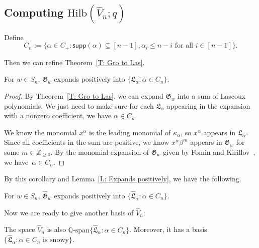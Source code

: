 \documentclass[ALCO]{cedram}
\newcommand{\fG}{\mathfrak{G}}
\newcommand{\fGb}{\fG}
\newcommand{\fL}{\mathfrak{L}}
\newcommand{\fLb}{\fL}
\newcommand{\topLas}{\widehat{\fL}}
\newcommand{\topGro}{\widehat{\fG}}
\newcommand{\supp}{\mathsf{supp}}
\newcommand{\Q}{\mathbb{Q}}
\newcommand{\Hilb}{\mathrm{Hilb}}
\begin{document}
\subsection{Computing \texorpdfstring{$\Hilb(\widehat{V}_n; q)$}{TEXT}}
\label{subsec.hilbert.vn}

Define 
$$C_n := \{ \alpha \in C_+: \supp(\alpha) \subseteq [n - 1], \alpha_i \leq n - i \textrm{ for all $i \in [n - 1]$}\}.$$

Then we can refine 
Theorem~\ref{T: Gro to Las}.
\begin{cor}
\label{C: Gro to Las for n}
For $w \in S_n$, 
$\fGb_w$ expands positively into $\{\fLb_\alpha: \alpha \in C_n\}$.
\end{cor}
\begin{proof}
By Theorem~\ref{T: Gro to Las},
we can expand $\fGb_w$ into a sum of Lascoux polynomials.
We just need to make sure for each $\fLb_{\alpha}$ appearing
in the expansion with a nonzero coefficient,
we have $\alpha \in C_n$.

We know the monomial $x^\alpha$ is the leading monomial of 
$\kappa_\alpha$, so $x^\alpha$ appears in $\fLb_\alpha$.
Since all coefficients in the sum are positive,
we know $x^\alpha \beta^m$ appears in $\fGb_w$ for
some $m \in \mathbb{Z}_{\geq 0}$.
By the monomial expansion of $\fGb_w$ 
given by Fomin and Kirillov~\cite{FK},
we have~$\alpha \in C_n$.
\end{proof}

By this corollary and Lemma~\ref{L: Expands positively},
we have the following. 
\begin{cor}
\label{C: Top Gro to Top Las for n}
For $w \in S_n$, 
$\topGro_w$ expands positively 
into $\{\topLas_\alpha: \alpha \in C_n\}$.
\end{cor}

Now we are ready to give another basis of $\widehat{V}_n$:
\begin{prop}
\label{P: Top Las basis}
The space $\widehat{V}_n$ is also $\Q\textrm{-span}\{\topLas_\alpha: \alpha \in C_n\}$. 
Moreover, it has a basis 
$\{ \topLas_\alpha: \alpha \in C_n \textrm{ is snowy}\}$.
\end{prop}
\end{document}
